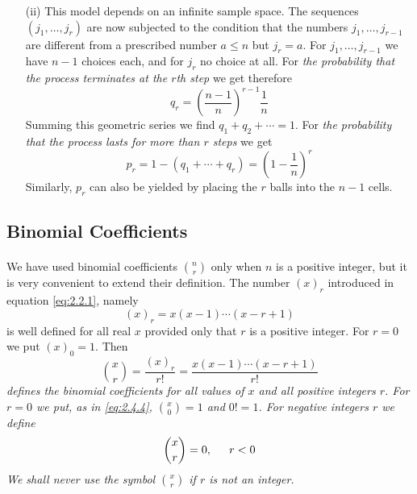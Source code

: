 \documentclass{article}
\numberwithin{equation}{subsection}
\begin{document}
\begin{enumerate}
			\item[(ii)] This model depends on an infinite sample space. The sequences $(j_1,\dots,j_r)$ are now subjected to the condition that the numbers $j_1,\dots,j_{r-1}$ are different from a prescribed number $a\leq n$ but $j_r=a$. For $j_1,\dots,j_{r-1}$ we have $n-1$ choices each, and for $j_r$ no choice at all. For \textit{the probability that the process terminates at the $r$th step} we get therefore
			\begin{equation}
				\label{eq:2.7.4}
				q_r=\left(\frac{n-1}{n}\right)^{r-1}\frac{1}{n}
			\end{equation}
			Summing this geometric series we find $q_1+q_2+\cdots=1$. For \textit{the probability that the process lasts for more than $r$ steps} we get
			\begin{equation}
				\label{eq:2.7.5}
				p_r=1-(q_1+\cdots+q_r) = \left(1-\frac{1}{n}\right)^r
			\end{equation}
			Similarly, $p_r$ can also be yielded by placing the $r$ balls into the $n-1$ cells.
			\end{enumerate}			
		\subsection{Binomial Coefficients}
			\paragraph{} We have used binomial coefficients ${n \choose r}$ only when $n$ is a positive integer, but it is very convenient to extend their definition. The number $(x)_r$ introduced in equation \eqref{eq:2.2.1}, namely
			\begin{equation}
				\label{eq:2.8.1}
				(x)_r=x(x-1)\cdots(x-r+1)
			\end{equation}
			is well defined for all real $x$ provided only that $r$ is a positive integer. For $r=0$ we put $(x)_0=1$. Then
			\begin{equation}
				\label{eq:2.8.2}
				{x \choose r} = \frac{(x)_r}{r!} = \frac{x(x-1)\cdots(x-r+1)}{r!}
			\end{equation}
			\textit{defines the binomial coefficients for all values of $x$ and all positive integers $r$. For $r=0$ we put, as in \eqref{eq:2.4.4}, ${x\choose 0} = 1$ and $0! =1$. For negative integers $r$ we define}
			\begin{equation}
				\label{eq:2.8.3}
				{x \choose r} = 0, \indent r<0
			\end{equation} \textit{We shall never use the symbol ${x\choose r}$ if $r$ is not an integer.}
\end{document}
